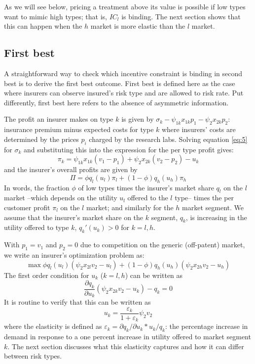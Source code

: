 \documentclass[a4paper,12pt]{article}
\begin{document}
As we will see below, pricing a treatment above its value is possible if low types want to mimic high types; that is, \(IC_l\) is binding. The next section shows that this can happen when the \(h\) market is more elastic than the \(l\) market.

\subsection{First best}
\label{sec:orgc36344b}

A straightforward way to check which incentive constraint is binding in second best is to derive the first best outcome. First best is defined here as the case where insurers can observe insured's risk type and are allowed to risk rate. Put differently, first best here refers to the absence of asymmetric information.

The profit an insurer makes on type \(k\) is given by \(\sigma_k - \psi_{1k}x_{1k}p_1 - \psi_{2}x_{2k}p_2\): insurance premium minus expected costs for type \(k\) where insurers' costs are determined by the prices \(p_{i}\) charged by the research labs. Solving equation \eqref{eq:5} for \(\sigma_{k}\) and substituting this into the expression for the per type profit gives:
\begin{equation}
\label{eq:6}
\pi_k = \psi_{1k}x_{1k}(v_1-p_1)+\psi_{2}x_{2k}(v_2-p_2)-u_k
\end{equation}
and the insurer's overall profits are given by
\begin{equation}
\label{eq:7}
\Pi = \phi q_l(u_l) \pi_l +(1-\phi)q_h(u_h) \pi_h
\end{equation}
In words, the fraction \(\phi\) of low types times the insurer's market share \(q_l\) on the \(l\) market --which depends on the utility \(u_l\) offered to the \(l\) type-- 
times the per customer profit \(\pi_l\) on the \(l\) market; and similarly for the \(h\) market segment. We assume that the insurer's market share on the \(k\) segment, \(q_k\), is increasing in the utility offered to type \(k\), \(q_k'(u_k)>0\) for \(k=l,h\). 

With \(p_1=v_1\) and \(p_2=0\) due to competition on the generic (off-patent) market, we write an insurer's optimization problem as:
\begin{equation}
\max \phi q_l(u_l) (\psi_2 x_{2l} v_2 -u_l) + (1-\phi) q_h(u_h) (\psi_2 x_{2h} v_2 -u_h)
\end{equation}
The first order condition for \(u_k\) (\(k=l,h\)) can be written as
\begin{equation}
\frac{\partial q_{k}}{\partial u_{k}} (\psi_2 x_{2k} v_2 - u_k) - q_k = 0
\end{equation}
It is routine to verify that this can be written as
\begin{equation}
\label{eq:elastEquation}
u_k = \frac{\varepsilon_{k}}{1+\varepsilon_{k}}\psi_2 v_2
\end{equation}
where the elasticity is defined as \(\varepsilon_k = \partial q_k/\partial u_k * u_k/q_k\): the percentage increase in demand in response to a one percent increase in utility offered to market segment \(k\). The next section discusses what this elasticity captures and how it can differ between risk types.
\end{document}
